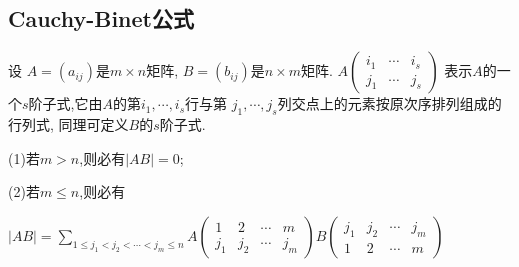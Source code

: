 \subsection{Cauchy-Binet公式}

\begin{theorem}\label{thm:Cauchy-Binet}
  设 $A=(a_{ij})$是$m \times n$矩阵, $B=(b_{ij})$是$n \times m$矩阵.
  $A\left(\begin{smallmatrix}i_1 & \cdots & i_s \\
      j_1 & \cdots & j_s \end{smallmatrix}\right)$
  表示$A$的一个$s$阶子式,它由$A$的第$i_1, \cdots, i_s$行与第
  $j_1, \cdots, j_s$列交点上的元素按原次序排列组成的行列式,
  同理可定义$B$的$s$阶子式.\par
  (1)若$m>n$,则必有$\left\vert AB \right\vert=0$;\par
  (2)若$m \le n$,则必有\par
  $|AB|= \sum\limits_{1 \le j_1<j_2<\cdots<j_m \le n}
  A\left(\begin{smallmatrix}
      1 & 2 & \cdots & m \\
      j_1 & j_2 & \cdots & j_m \end{smallmatrix}\right)
  B\left(\begin{smallmatrix}
      j_1 & j_2 & \cdots & j_m\\
      1 & 2 & \cdots & m \end{smallmatrix}\right)$

\end{theorem}

